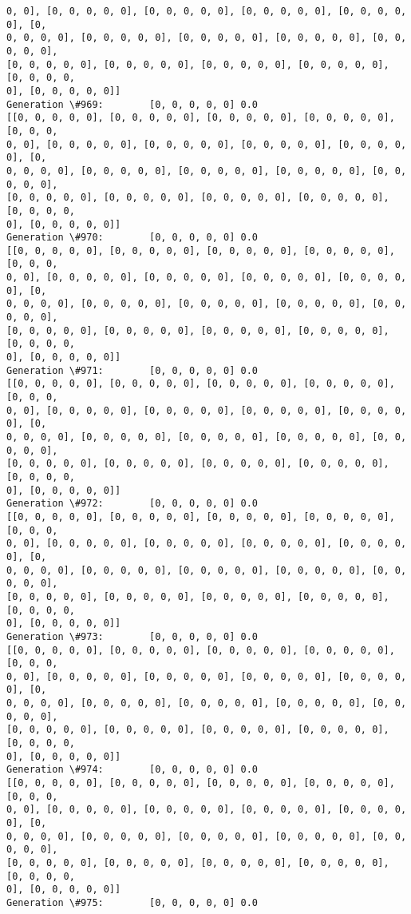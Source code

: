 \documentclass[11pt]{article}
\begin{document}
\begin{Verbatim}[commandchars=\\\{\}]
0, 0], [0, 0, 0, 0, 0], [0, 0, 0, 0, 0], [0, 0, 0, 0, 0], [0, 0, 0, 0, 0], [0,
0, 0, 0, 0], [0, 0, 0, 0, 0], [0, 0, 0, 0, 0], [0, 0, 0, 0, 0], [0, 0, 0, 0, 0],
[0, 0, 0, 0, 0], [0, 0, 0, 0, 0], [0, 0, 0, 0, 0], [0, 0, 0, 0, 0], [0, 0, 0, 0,
0], [0, 0, 0, 0, 0]]
Generation \#969:        [0, 0, 0, 0, 0] 0.0
[[0, 0, 0, 0, 0], [0, 0, 0, 0, 0], [0, 0, 0, 0, 0], [0, 0, 0, 0, 0], [0, 0, 0,
0, 0], [0, 0, 0, 0, 0], [0, 0, 0, 0, 0], [0, 0, 0, 0, 0], [0, 0, 0, 0, 0], [0,
0, 0, 0, 0], [0, 0, 0, 0, 0], [0, 0, 0, 0, 0], [0, 0, 0, 0, 0], [0, 0, 0, 0, 0],
[0, 0, 0, 0, 0], [0, 0, 0, 0, 0], [0, 0, 0, 0, 0], [0, 0, 0, 0, 0], [0, 0, 0, 0,
0], [0, 0, 0, 0, 0]]
Generation \#970:        [0, 0, 0, 0, 0] 0.0
[[0, 0, 0, 0, 0], [0, 0, 0, 0, 0], [0, 0, 0, 0, 0], [0, 0, 0, 0, 0], [0, 0, 0,
0, 0], [0, 0, 0, 0, 0], [0, 0, 0, 0, 0], [0, 0, 0, 0, 0], [0, 0, 0, 0, 0], [0,
0, 0, 0, 0], [0, 0, 0, 0, 0], [0, 0, 0, 0, 0], [0, 0, 0, 0, 0], [0, 0, 0, 0, 0],
[0, 0, 0, 0, 0], [0, 0, 0, 0, 0], [0, 0, 0, 0, 0], [0, 0, 0, 0, 0], [0, 0, 0, 0,
0], [0, 0, 0, 0, 0]]
Generation \#971:        [0, 0, 0, 0, 0] 0.0
[[0, 0, 0, 0, 0], [0, 0, 0, 0, 0], [0, 0, 0, 0, 0], [0, 0, 0, 0, 0], [0, 0, 0,
0, 0], [0, 0, 0, 0, 0], [0, 0, 0, 0, 0], [0, 0, 0, 0, 0], [0, 0, 0, 0, 0], [0,
0, 0, 0, 0], [0, 0, 0, 0, 0], [0, 0, 0, 0, 0], [0, 0, 0, 0, 0], [0, 0, 0, 0, 0],
[0, 0, 0, 0, 0], [0, 0, 0, 0, 0], [0, 0, 0, 0, 0], [0, 0, 0, 0, 0], [0, 0, 0, 0,
0], [0, 0, 0, 0, 0]]
Generation \#972:        [0, 0, 0, 0, 0] 0.0
[[0, 0, 0, 0, 0], [0, 0, 0, 0, 0], [0, 0, 0, 0, 0], [0, 0, 0, 0, 0], [0, 0, 0,
0, 0], [0, 0, 0, 0, 0], [0, 0, 0, 0, 0], [0, 0, 0, 0, 0], [0, 0, 0, 0, 0], [0,
0, 0, 0, 0], [0, 0, 0, 0, 0], [0, 0, 0, 0, 0], [0, 0, 0, 0, 0], [0, 0, 0, 0, 0],
[0, 0, 0, 0, 0], [0, 0, 0, 0, 0], [0, 0, 0, 0, 0], [0, 0, 0, 0, 0], [0, 0, 0, 0,
0], [0, 0, 0, 0, 0]]
Generation \#973:        [0, 0, 0, 0, 0] 0.0
[[0, 0, 0, 0, 0], [0, 0, 0, 0, 0], [0, 0, 0, 0, 0], [0, 0, 0, 0, 0], [0, 0, 0,
0, 0], [0, 0, 0, 0, 0], [0, 0, 0, 0, 0], [0, 0, 0, 0, 0], [0, 0, 0, 0, 0], [0,
0, 0, 0, 0], [0, 0, 0, 0, 0], [0, 0, 0, 0, 0], [0, 0, 0, 0, 0], [0, 0, 0, 0, 0],
[0, 0, 0, 0, 0], [0, 0, 0, 0, 0], [0, 0, 0, 0, 0], [0, 0, 0, 0, 0], [0, 0, 0, 0,
0], [0, 0, 0, 0, 0]]
Generation \#974:        [0, 0, 0, 0, 0] 0.0
[[0, 0, 0, 0, 0], [0, 0, 0, 0, 0], [0, 0, 0, 0, 0], [0, 0, 0, 0, 0], [0, 0, 0,
0, 0], [0, 0, 0, 0, 0], [0, 0, 0, 0, 0], [0, 0, 0, 0, 0], [0, 0, 0, 0, 0], [0,
0, 0, 0, 0], [0, 0, 0, 0, 0], [0, 0, 0, 0, 0], [0, 0, 0, 0, 0], [0, 0, 0, 0, 0],
[0, 0, 0, 0, 0], [0, 0, 0, 0, 0], [0, 0, 0, 0, 0], [0, 0, 0, 0, 0], [0, 0, 0, 0,
0], [0, 0, 0, 0, 0]]
Generation \#975:        [0, 0, 0, 0, 0] 0.0

\end{Verbatim}
\end{document}
